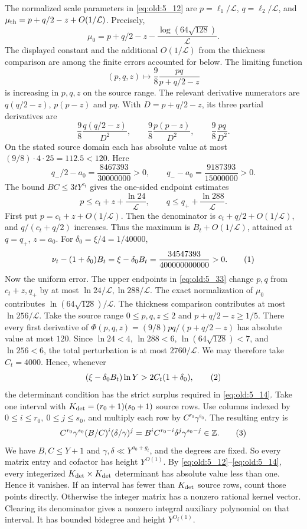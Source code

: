The normalized scale parameters in \eqref{eq:old:5_12} are
\(p=\ell_1/\mathcal L\), \(q=\ell_2/\mathcal L\), and
\(\mu_{\rm th}=p+q/2-z+O(1/\mathcal L)\). Precisely,
\[
 \mu_0=p+q/2-z-\frac{\log(64\sqrt{128})}{\mathcal L}.
\]
The displayed constant and the additional \(O(1/\mathcal L)\) from the
thickness comparison are among the finite errors accounted for below.
The limiting function
\[
 (p,q,z)\longmapsto \frac98\frac{pq}{p+q/2-z}
\]
is increasing in \(p,q,z\) on the source range. The relevant derivative
numerators are \(q(q/2-z)\), \(p(p-z)\) and \(pq\). With
\(D=p+q/2-z\), its three partial derivatives are
\[
\frac98\frac{q(q/2-z)}{D^2},\qquad
\frac98\frac{p(p-z)}{D^2},\qquad
\frac98\frac{pq}{D^2}.
\]
On the stated source domain each has absolute value at most
\((9/8)\cdot4\cdot25=112.5<120\). Here
\[
 q_-/2-a_0=\frac{8467393}{30000000}>0,\qquad
 q_--a_0=\frac{9187393}{15000000}>0.
\]
The bound \(BC\le3tY^{c_t}\) gives the one-sided endpoint estimates
\[
p\le c_t+z+\frac{\ln24}{\mathcal L},\qquad
q\le q_++\frac{\ln288}{\mathcal L}.
\]
First put \(p=c_t+z+O(1/\mathcal L)\). Then the denominator is
\(c_t+q/2+O(1/\mathcal L)\), and \(q/(c_t+q/2)\) increases. Thus the
maximum is \(B_t+O(1/\mathcal L)\), attained at \(q=q_+\), \(z=a_0\).
For \(\delta_0=\xi/4=1/40000\),
\[
 \nu_t-(1+\delta_0)B_t
 =\xi-\delta_0B_t
 =\frac{34547393}{400000000000}>0.
\AutoTag{eq:old:5_40}
\]
Now the uniform error. The upper endpoints in \eqref{eq:old:5_33} change \(p,q\)
from \(c_t+z,q_+\) by at most \(\ln24/\mathcal L,\ln288/\mathcal L\).
The exact normalization of \(\mu_0\) contributes
\(\ln(64\sqrt{128})/\mathcal L\). The thickness comparison contributes
at most \(\ln256/\mathcal L\). Take the source range
\(0\le p,q,z\le2\) and \(p+q/2-z\ge1/5\). There every first derivative of
\(\Phi(p,q,z)=(9/8)pq/(p+q/2-z)\) has absolute value at most \(120\).
Since \(\ln24<4\), \(\ln288<6\), \(\ln(64\sqrt{128})<7\), and
\(\ln256<6\), the total perturbation is at most \(2760/\mathcal L\).
We may therefore take \(C_t=4000\). Hence, whenever
\[
(\xi-\delta_0B_t)\ln Y>2C_t(1+\delta_0),
\AutoTag{eq:old:5_41}
\]
the determinant condition has the strict surplus required in \eqref{eq:old:5_14}.
Take one interval with \(K_{\rm det}=(r_0+1)(s_0+1)\) source rows. Use columns
indexed by \(0\le i\le r_0,\ 0\le j\le s_0\), and multiply each row by
\(C^{r_0}\gamma^{s_0}\). The resulting entry is
\[
 C^{r_0}\gamma^{s_0}(B/C)^i(\delta/\gamma)^j
 =B^iC^{r_0-i}\delta^j\gamma^{s_0-j}\in\mathbb Z.
\AutoTag{eq:old:5_42}
\]
We have \(B,C\le Y+1\) and \(\gamma,\delta\ll Y^{a_0+g_t}\), and the degrees are
fixed. So every matrix entry and cofactor has height \(Y^{O(1)}\). By
\eqref{eq:old:5_12}--\eqref{eq:old:5_14}, every integerized \(K_{\rm det}\times K_{\rm det}\) determinant has absolute
value less than one. Hence it vanishes. If an interval has fewer than
\(K_{\rm det}\) source rows, count those points directly. Otherwise the integer
matrix has a nonzero rational kernel vector. Clearing its denominator
gives a nonzero integral auxiliary polynomial on that interval. It has
bounded bidegree and height \(Y^{O_\xi(1)}\).

